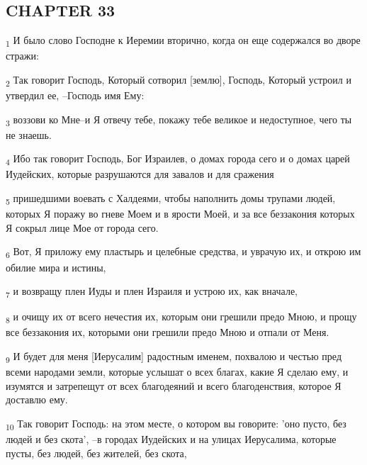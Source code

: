 \subsection{CHAPTER 33}
\begin{tcolorbox}
\textsubscript{1} И было слово Господне к Иеремии вторично, когда он еще содержался во дворе стражи:
\end{tcolorbox}
\begin{tcolorbox}
\textsubscript{2} Так говорит Господь, Который сотворил [землю], Господь, Который устроил и утвердил ее, --Господь имя Ему:
\end{tcolorbox}
\begin{tcolorbox}
\textsubscript{3} воззови ко Мне--и Я отвечу тебе, покажу тебе великое и недоступное, чего ты не знаешь.
\end{tcolorbox}
\begin{tcolorbox}
\textsubscript{4} Ибо так говорит Господь, Бог Израилев, о домах города сего и о домах царей Иудейских, которые разрушаются для завалов и для сражения
\end{tcolorbox}
\begin{tcolorbox}
\textsubscript{5} пришедшими воевать с Халдеями, чтобы наполнить домы трупами людей, которых Я поражу во гневе Моем и в ярости Моей, и за все беззакония которых Я сокрыл лице Мое от города сего.
\end{tcolorbox}
\begin{tcolorbox}
\textsubscript{6} Вот, Я приложу ему пластырь и целебные средства, и уврачую их, и открою им обилие мира и истины,
\end{tcolorbox}
\begin{tcolorbox}
\textsubscript{7} и возвращу плен Иуды и плен Израиля и устрою их, как вначале,
\end{tcolorbox}
\begin{tcolorbox}
\textsubscript{8} и очищу их от всего нечестия их, которым они грешили предо Мною, и прощу все беззакония их, которыми они грешили предо Мною и отпали от Меня.
\end{tcolorbox}
\begin{tcolorbox}
\textsubscript{9} И будет для меня [Иерусалим] радостным именем, похвалою и честью пред всеми народами земли, которые услышат о всех благах, какие Я сделаю ему, и изумятся и затрепещут от всех благодеяний и всего благоденствия, которое Я доставлю ему.
\end{tcolorbox}
\begin{tcolorbox}
\textsubscript{10} Так говорит Господь: на этом месте, о котором вы говорите: 'оно пусто, без людей и без скота', --в городах Иудейских и на улицах Иерусалима, которые пусты, без людей, без жителей, без скота,
\end{tcolorbox}
